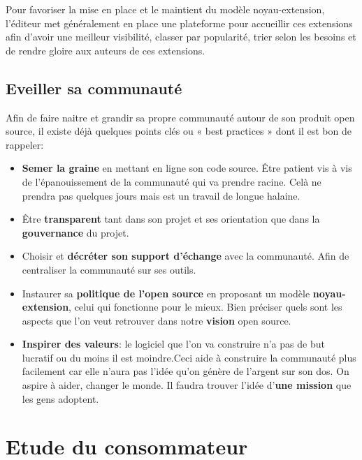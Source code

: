 			Pour favoriser la mise en place et le maintient du modèle noyau-extension, l'éditeur met généralement en place une plateforme pour accueillir ces extensions afin d'avoir une meilleur visibilité, classer par popularité, trier selon les besoins et de rendre gloire aux auteurs de ces extensions.
			
		\subsection{Eveiller sa communauté}

			Afin de faire naitre et grandir sa propre communauté autour de son produit open source, il existe déjà quelques points clés ou « best practices » dont il est bon de rappeler:

			\begin{itemize}[label=\textbullet, font=\LARGE \color{burntorange}]
				\item \textbf{Semer la graine} en mettant en ligne son code source. Être patient vis à vis de l'épanouissement de la communauté qui va prendre racine. Celà ne prendra pas quelques jours mais est un travail de longue halaine.
				\item Être \textbf{transparent} tant dans son projet et ses orientation que dans la \textbf{gouvernance} du projet.
				\item Choisir et \textbf{décréter son support d'échange} avec la communauté. Afin de centraliser la communauté sur ses outils.
				\item Instaurer sa \textbf{politique de l'open source} en proposant un modèle \textbf{noyau-extension}, celui qui fonctionne pour le mieux. Bien préciser quels sont les aspects que l'on veut retrouver dans notre \textbf{vision} open source.
				\item \textbf{Inspirer des valeurs}: le logiciel que l'on va construire n'a pas de but lucratif ou du moins il est moindre.Ceci aide à construire la communauté plus facilement car elle n'aura pas l'idée qu'on génère de l'argent sur son dos. On aspire à aider, changer le monde. Il faudra trouver l'idée d'\textbf{une mission} que les gens adoptent.
			\end{itemize}

	\section{Etude du consommateur} %

